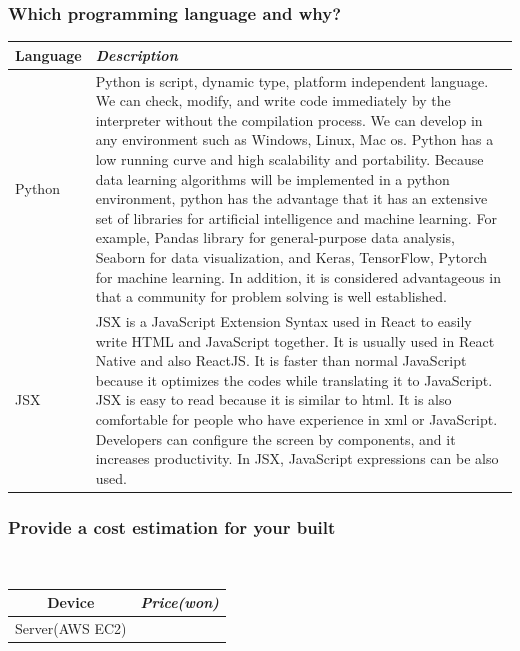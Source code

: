 \documentclass[conference]{IEEEtran}
\begin{document}
\subsubsection{Which programming language and why?}
\begin{table}[htbp]
\begin{center}
\begin{tabular}{|p{}|p{}|}
\cline{1-2}
\textbf{Language} & \textbf{\textit{Description}} \\
\hline
Python&Python is script, dynamic type, platform independent language. 
We can check, modify, and write code immediately by the interpreter without the compilation process.
We can develop in any environment such as Windows, Linux, Mac os. 
Python has a low running curve and high scalability and portability. 
Because data learning algorithms will be implemented in a python environment, python has the advantage that it has an extensive set of libraries for artificial intelligence and machine learning. For example, Pandas library for general-purpose data analysis, Seaborn  for data visualization, and Keras, TensorFlow, Pytorch for machine learning. In addition, it is considered advantageous in that a community for problem solving is well established.\\
\hline
JSX&JSX is a JavaScript Extension Syntax used in React to easily write HTML and JavaScript together. It is usually used in React Native and also ReactJS. It is faster than normal JavaScript because it optimizes the codes while translating it to JavaScript. JSX is easy to read because it is similar to html. It is also comfortable for people who have experience in xml or JavaScript. Developers can configure the screen by components, and it increases productivity. In JSX, JavaScript expressions can be also used. \\
\hline
\end{tabular}
\label{tab1}
\end{center}
\end{table}


\subsubsection{Provide a cost estimation for your built}\\
\begin{table}[htbp]
\begin{center}
\begin{tabular}{|c|c|}
\cline{1-2}
\textbf{Device} & \textbf{\textit{Price(won)}} \\
\hline
Server(AWS EC2)&  \\
\hline


\end{tabular}
\label{tab1}
\end{center}
\end{table}
\end{document}
